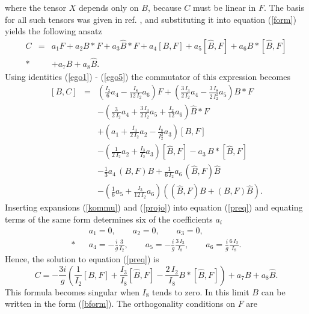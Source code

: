 \documentclass[a4paper,12pt]{article}
\begin{document}
where the tensor $X$ depends only on $B$, because $C$ must be linear in $F$. The basis for all such tensors was given in ref. \cite{msw}, and substituting it into equation (\ref{form}) yields the following ansatz
\begin{eqnarray}\label{ansatz}
C &=& a_1 F + a_2 B*F + a_3 \widehat{B}*F + a_4 [B,F] + a_5 [\widehat{B},F] + a_6 B*[\widehat{B},F] \nonumber \\*
&& + a_7 B + a_8 \widehat{B}.
\end{eqnarray}
Using identities (\ref{ego1}) - (\ref{ego5}) the commutator of this expression becomes
\begin{eqnarray}\label{kommu}
[B,C] &=& \left( \frac{I_2}{6} a_4 - \frac{I_8}{12 \, I_2} a_6 \right) F + \left( \frac{3 \, I_3}{2 \, I_2} a_4 -
\frac{3 \, I_8}{2 \, I_2^2} a_5 \right) B*F \nonumber \\
&& - \left( \frac{3}{2 \, I_2} a_4 + \frac{3 \, I_3}{2 \, I_2} a_5 + \frac{I_2}{12} a_6 \right) \widehat{B}*F \nonumber \\
&& + \left( a_1 + \frac{I_3}{2 \, I_2} a_2 - \frac{I_8}{I_2^2} a_3 \right) [B,F] \\
&& -  \left( \frac{1}{2 \, I_2} a_2 + \frac{I_3}{I_2} a_3 \right) [\widehat{B},F] - a_3 \, B*[\widehat{B},F] \nonumber \\
&& - \frac{1}{3} a_4 \, (B,F) B + \frac{1}{6 \, I_2} a_6 \, (\widehat{B},F) \widehat{B} \nonumber \\
&& - \left( \frac{1}{6} a_5 + \frac{I_3}{12 \, I_2} a_6 \right) \left( (\widehat{B},F) B + (B,F) \widehat{B} \right). \nonumber
\end{eqnarray}
Inserting expansions (\ref{kommu}) and (\ref{projo}) into equation (\ref{preq}) and equating terms of
the same form determines six of the coefficients $a_i$
\begin{eqnarray*}
&& a_1 = 0, \qquad a_2 = 0, \qquad a_3 = 0, \\*
&& a_4 = - \frac{i}{g} \frac{3}{I_2}, \qquad a_5 = - \frac{i}{g} \frac{3 \, I_3}{ I_8}, \qquad a_6 = \frac{i}{g} \frac{6 \, I_2}{I_8}.
\end{eqnarray*}
Hence, the solution to equation (\ref{preq}) is
\begin{equation}\label{solu}
C = - \frac{3i}{g} \left( \frac{1}{I_2} [B,F] + \frac{I_3}{I_8} [\widehat{B},F] - \frac{2 \, I_2}{I_8} B*[\widehat{B},F] \right)
+ a_7 B + a_8 \widehat{B}.
\end{equation}
This formula becomes singular when $I_8$ tends to zero. In this limit $B$ can be written in the form (\ref{bform}). The orthogonality conditions on $F$ are
\end{document}
